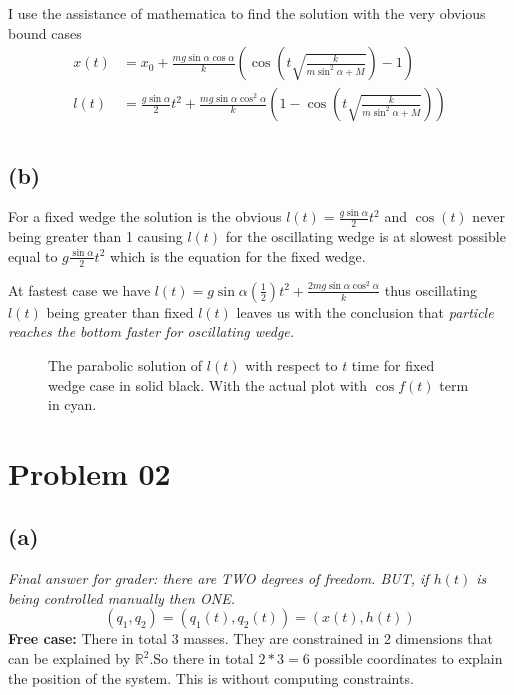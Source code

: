 \documentclass[letter, 10pts]{article}
\begin{document}
I use the assistance of mathematica to find the solution with the very obvious bound cases 
\begin{align*}
	x(t) &= x_0 + \frac{mg \sin \alpha \cos \alpha}{k} 
	\left(\cos 
	\left(t\sqrt{\frac{k}{m \sin ^2 \alpha + M} }   \right) - 1\right)\\
	l(t) &= \frac{g \sin \alpha }{2} t^2 + 
	\frac{mg \sin \alpha \cos ^2 \alpha}{k} 
	\left(1-
\cos \left(
t \sqrt{\frac{k}{m \sin ^2 \alpha + M}} 
\right)
	\right)\\
\end{align*}

\subsection*{(b)} 
For a fixed wedge the solution is the obvious $l(t) = \frac{g \sin \alpha}{2}t^2$ and $\cos (t)$ never being greater than 1 causing $l(t)$ for the oscillating wedge is at slowest possible equal to $g \frac{\sin \alpha}{2} t^2$ which is the equation for the fixed wedge. 

At fastest case we have $l(t) = g \sin \alpha (\frac{1}{2}) t^2 + \frac{2 mg \sin \alpha \cos ^2 \alpha  }{k}$ thus oscillating $l(t)$ being greater than fixed $l(t)$ leaves us with the conclusion that  \emph{particle reaches the bottom faster for oscillating wedge.}
\begin{figure}[H]
	\centering
	\caption{The parabolic solution of $l(t)$ with respect to $t$ time for fixed wedge case in solid black. With the actual plot with $\cos f(t)$ term in cyan.}
	\label{}
\end{figure}

\section*{Problem 02} 
\subsection*{(a)} 
\emph{Final answer for grader: there are TWO degrees of freedom. BUT, if $h(t)$ is being controlled manually then ONE.}
\[
	(q_1,q_2) = (q_1(t), q_2(t)) = (x(t) , h(t))
\]  
\textbf{Free case:} There in total 3 masses. They are constrained in 2 dimensions that can be explained by $\mathbb{R}^{2}$.So there in total $2*3 = 6$ possible coordinates to explain the position of the system. This is without computing constraints. 
\end{document}
